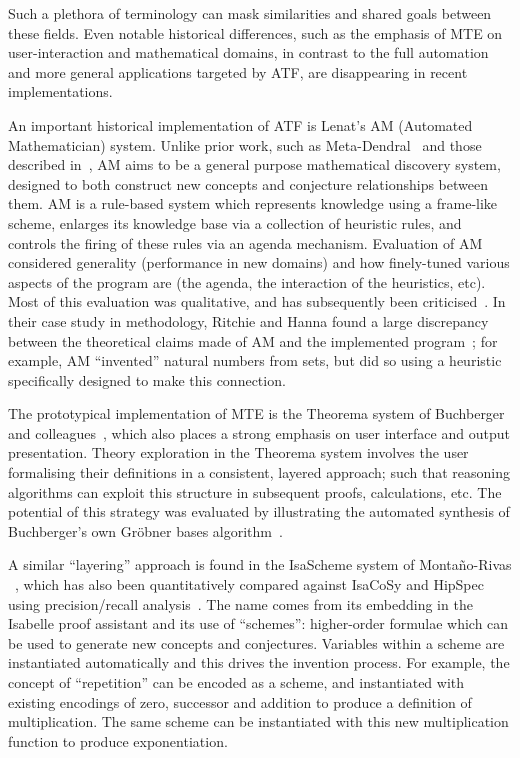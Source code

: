 Such a plethora of terminology can mask similarities and shared goals between
these fields. Even notable historical differences, such as the emphasis of MTE
on user-interaction and mathematical domains, in contrast to the full automation
and more general applications targeted by ATF, are disappearing in recent
implementations.

An important historical implementation of ATF is Lenat's AM (Automated
Mathematician) system. Unlike prior work, such as
Meta-Dendral~\cite{buchanan:75} and those described in~\cite{winston}, AM aims
to be a general purpose mathematical discovery system, designed to both
construct new concepts and conjecture relationships between them. AM is a
rule-based system which represents knowledge using a frame-like scheme, enlarges
its knowledge base via a collection of heuristic rules, and controls the firing
of these rules via an agenda mechanism. Evaluation of AM considered generality
(performance in new domains) and how finely-tuned various aspects of the program
are (the agenda, the interaction of the heuristics, etc). Most of this
evaluation was qualitative, and has subsequently been
criticised~\cite[chap.~13]{colton:book}. In their case study in methodology,
Ritchie and Hanna found a large discrepancy between the theoretical claims made
of AM and the implemented program~\cite{ritchie1984case}; for example, AM ``invented''
natural numbers from sets, but did so using a heuristic specifically designed to
make this connection.

The prototypical implementation of MTE is the Theorema system of Buchberger and
colleagues~\cite{buchberger,buchberger2016theorema}, which also places a strong
emphasis on user interface and output presentation. Theory exploration in the
Theorema system involves the user formalising their definitions in a consistent,
layered approach; such that reasoning algorithms can exploit this structure in
subsequent proofs, calculations, etc. The potential of this strategy was
evaluated by illustrating the automated synthesis of Buchberger's own Gr\"obner
bases algorithm~\cite{buchberger:04}.

A similar ``layering'' approach is found in the IsaScheme system of
Monta{\~n}o-Rivas \etal{}~\cite{Montano-Rivas.McCasland.Dixon.ea:2012}, which
has also been quantitatively compared against IsaCoSy and HipSpec using
precision/recall analysis~\cite{claessen2013automating}. The name comes from its
embedding in the Isabelle proof assistant and its use of ``schemes'':
higher-order formulae which can be used to generate new concepts and
conjectures. Variables within a scheme are instantiated automatically and this
drives the invention process. For example, the concept of ``repetition'' can be
encoded as a scheme, and instantiated with existing encodings of zero, successor
and addition to produce a definition of multiplication. The same scheme can be
instantiated with this new multiplication function to produce exponentiation.

